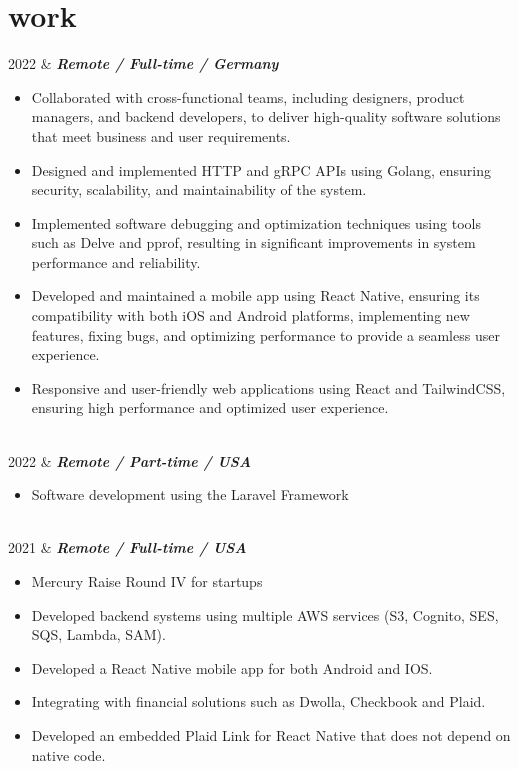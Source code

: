 \documentclass[]{cv-mauri}
\begin{document}
\section*{work}
\begin{tabularcv}
	2022   &   
					\textbf{\textit{Remote / Full-time / Germany}}

			\begin{itemize}
				\item Collaborated with cross-functional teams, including designers, product managers, and backend developers, to deliver high-quality software solutions that meet business and user requirements.
				\item Designed and implemented HTTP and gRPC APIs using Golang, ensuring security, scalability, and maintainability of the system.
				\item Implemented software debugging and optimization techniques using tools such as Delve and pprof, resulting in significant improvements in system performance and reliability.
				\item Developed and maintained a mobile app using React Native, ensuring its compatibility with both iOS and Android platforms, implementing new features, fixing bugs, and optimizing performance to provide a seamless user experience.
				\item Responsive and user-friendly web applications using React and TailwindCSS, ensuring high performance and optimized user experience.
			\end{itemize}
					\\[\vspacepar]
	2022   &   
					\textbf{\textit{Remote / Part-time / USA}}

			\begin{itemize}
				\item Software development using the Laravel Framework 
			\end{itemize}
					\\[\vspacepar]
	2021   &   
					\textbf{\textit{Remote / Full-time / USA}}

			\begin{itemize}
				\item Mercury Raise Round IV for startups
				\item Developed backend systems using multiple AWS services (S3, Cognito, SES, SQS, Lambda, SAM).
				\item Developed a React Native mobile app for both Android and IOS.
				\item Integrating with financial solutions such as Dwolla, Checkbook and Plaid.
				\item  Developed an embedded Plaid Link for React Native that does not depend on native code.
			\end{itemize}
					\\[\vspacepar]
	

\end{tabularcv}
\end{document}
